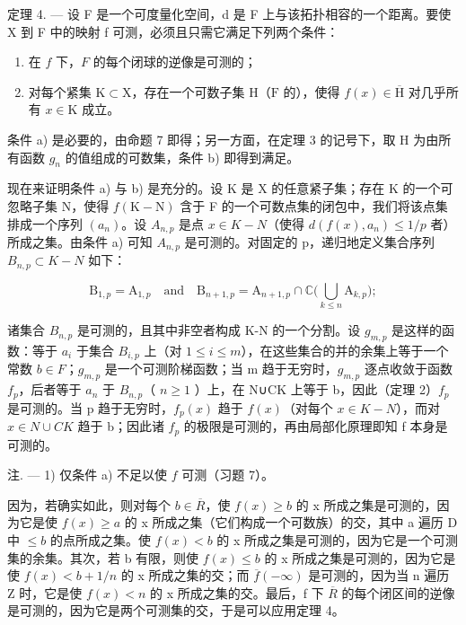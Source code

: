 定理 4. --- 设 F 是一个可度量化空间，d 是 F 上与该拓扑相容的一个距离。要使 X 到 F 中的映射 f 可测，必须且只需它满足下列两个条件：

\begin{enumerate}
\def\labelenumi{\alph{enumi})}
\item
  在 \(f\) 下，\(F\) 的每个闭球的逆像是可测的；
\item
  对每个紧集 \(\mathrm{K} \subset \mathrm{X}\)，存在一个可数子集 \(\mathrm{H}\)（\(\mathrm{F}\) 的），使得 \(f(x) \in \overline{\mathrm{H}}\) 对几乎所有 \(x \in \mathrm{K}\) 成立。
\end{enumerate}

条件 a) 是必要的，由命题 7 即得；另一方面，在定理 3 的记号下，取 H 为由所有函数 \(g_{n}\) 的值组成的可数集，条件 b) 即得到满足。

现在来证明条件 a) 与 b) 是充分的。设 K 是 X 的任意紧子集；存在 K 的一个可忽略子集 N，使得 \(f(\mathrm{K}-\mathrm{N})\) 含于 F 的一个可数点集的闭包中，我们将该点集排成一个序列 \((a_{n})\)。设 \(A_{n,p}\) 是点 \(x \in K-N\)（使得 \(d(f(x), a_{n}) \leqslant 1/p\) 者）所成之集。由条件 a) 可知 \(A_{n,p}\) 是可测的。对固定的 p，递归地定义集合序列 \(B_{n,p} \subset K-N\) 如下：

\[
\mathrm{B} _ {1, p} = \mathrm{A} _ {1, p} \quad \text {and} \quad \mathrm{B} _ {n + 1, p} = \mathrm{A} _ {n + 1, p} \cap \mathbb {C} \Big (\bigcup_ {k \leqslant n} \mathrm{A} _ {k, p} \Big);
\]

诸集合 \(B_{n,p}\) 是可测的，且其中非空者构成 K-N 的一个分割。设 \(g_{m,p}\) 是这样的函数：等于 \(a_{i}\) 于集合 \(B_{i,p}\) 上（对 \(1 \leqslant i \leqslant m\)），在这些集合的并的余集上等于一个常数 \(b \in F\)；\(g_{m,p}\) 是一个可测阶梯函数；当 m 趋于无穷时，\(g_{m,p}\) 逐点收敛于函数 \(f_{p}\)，后者等于 \(a_{n}\) 于 \(B_{n,p}\)（ \(n \geqslant 1\) ）上，在 N∪CK 上等于 b，因此（定理 2）\(f_{p}\) 是可测的。当 p 趋于无穷时，\(f_{p}(x)\) 趋于 \(f(x)\)（对每个 \(x \in K-N\)），而对 \(x \in N \cup CK\) 趋于 b；因此诸 \(f_{p}\) 的极限是可测的，再由局部化原理即知 f 本身是可测的。

注. --- 1) 仅条件 a) 不足以使 \(f\) 可测（习题 7）。

因为，若确实如此，则对每个 \(b \in \overline{R}\)，使 \(f(x) \geqslant b\) 的 x 所成之集是可测的，因为它是使 \(f(x) \geqslant a\) 的 x 所成之集（它们构成一个可数族）的交，其中 a 遍历 D 中 \(\leqslant b\) 的点所成之集。使 \(f(x) < b\) 的 x 所成之集是可测的，因为它是一个可测集的余集。其次，若 b 有限，则使 \(f(x) \leqslant b\) 的 x 所成之集是可测的，因为它是使 \(f(x) < b + 1/n\) 的 x 所成之集的交；而 \(\overline{f}(-\infty)\) 是可测的，因为当 n 遍历 Z 时，它是使 \(f(x) < n\) 的 x 所成之集的交。最后，f 下 \(\overline{R}\) 的每个闭区间的逆像是可测的，因为它是两个可测集的交，于是可以应用定理 4。

